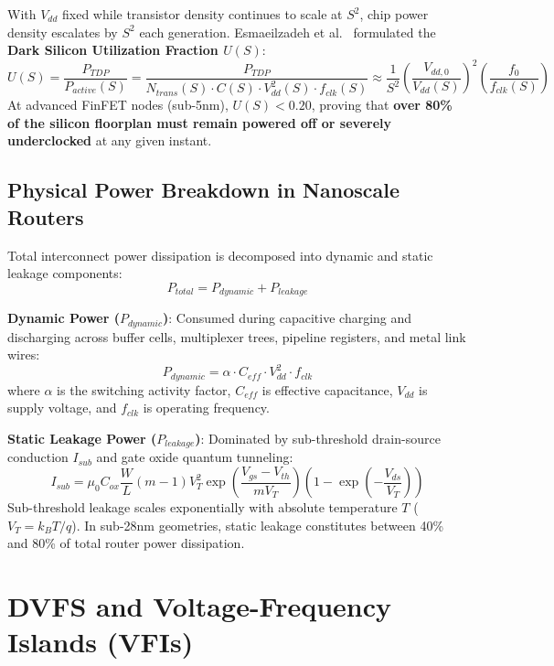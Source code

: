 With $V_{dd}$ fixed while transistor density continues to scale at $S^2$, chip power density escalates by $S^2$ each generation. Esmaeilzadeh et al.~\cite{Esmaeilzadeh2011} formulated the \textbf{Dark Silicon Utilization Fraction $U(S)$}:
\begin{equation}
U(S) = \frac{P_{TDP}}{P_{active}(S)} = \frac{P_{TDP}}{N_{trans}(S) \cdot C(S) \cdot V_{dd}^2(S) \cdot f_{clk}(S)} \approx \frac{1}{S^2} \left(\frac{V_{dd, 0}}{V_{dd}(S)}\right)^2 \left(\frac{f_0}{f_{clk}(S)}\right)
\label{eq:ch6_utilization}
\end{equation}
At advanced FinFET nodes (sub-5nm), $U(S) < 0.20$, proving that \textbf{over 80\% of the silicon floorplan must remain powered off or severely underclocked} at any given instant.

\subsection{Physical Power Breakdown in Nanoscale Routers}
Total interconnect power dissipation is decomposed into dynamic and static leakage components:
\begin{equation}
P_{total} = P_{dynamic} + P_{leakage}
\label{eq:ch6_ptotal}
\end{equation}

\textbf{Dynamic Power ($P_{dynamic}$)}: Consumed during capacitive charging and discharging across buffer cells, multiplexer trees, pipeline registers, and metal link wires:
\begin{equation}
P_{dynamic} = \alpha \cdot C_{eff} \cdot V_{dd}^2 \cdot f_{clk}
\label{eq:ch6_pdyn}
\end{equation}
where $\alpha$ is the switching activity factor, $C_{eff}$ is effective capacitance, $V_{dd}$ is supply voltage, and $f_{clk}$ is operating frequency.

\textbf{Static Leakage Power ($P_{leakage}$)}: Dominated by sub-threshold drain-source conduction $I_{sub}$ and gate oxide quantum tunneling:
\begin{equation}
I_{sub} = \mu_0 C_{ox} \frac{W}{L} (m - 1) V_T^2 \exp\left(\frac{V_{gs} - V_{th}}{m V_T}\right) \left(1 - \exp\left(-\frac{V_{ds}}{V_T}\right)\right)
\label{eq:ch6_leakage}
\end{equation}
Sub-threshold leakage scales exponentially with absolute temperature $T$ ($V_T = k_B T / q$). In sub-28nm geometries, static leakage constitutes between 40\% and 80\% of total router power dissipation.

\section{DVFS and Voltage-Frequency Islands (VFIs)}
\label{sec:ch6_dvfs}

